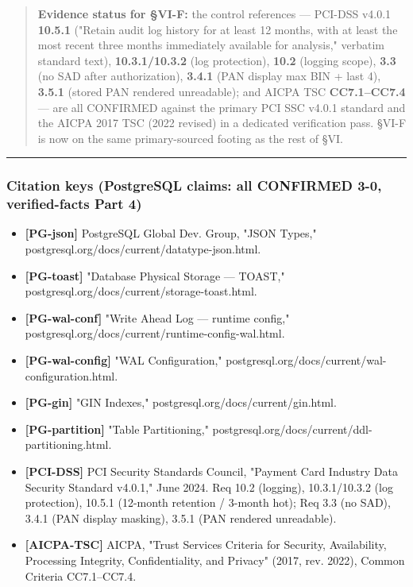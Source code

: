 \begin{quote}
\textbf{Evidence status for §VI-F:} the control references --- PCI-DSS
v4.0.1 \textbf{10.5.1} ("Retain audit log history for at least 12
months, with at least the most recent three months immediately available
for analysis," verbatim standard text), \textbf{10.3.1/10.3.2} (log
protection), \textbf{10.2} (logging scope), \textbf{3.3} (no SAD after
authorization), \textbf{3.4.1} (PAN display max BIN + last 4),
\textbf{3.5.1} (stored PAN rendered unreadable); and AICPA TSC
\textbf{CC7.1--CC7.4} --- are all CONFIRMED against the primary PCI SSC
v4.0.1 standard and the AICPA 2017 TSC (2022 revised) in a dedicated
verification pass. §VI-F is now on the same primary-sourced footing as
the rest of §VI.
\end{quote}

\begin{center}\rule{0.5\linewidth}{0.5pt}\end{center}

\subsubsection{Citation keys (PostgreSQL claims: all CONFIRMED 3-0,
verified-facts Part
4)}\label{citation-keys-postgresql-claims-all-confirmed-3-0-verified-facts-part-4}

\begin{itemize}
\tightlist
\item
  \textbf{{[}PG-json{]}} PostgreSQL Global Dev. Group, "JSON Types,"
  postgresql.org/docs/current/datatype-json.html.
\item
  \textbf{{[}PG-toast{]}} "Database Physical Storage --- TOAST,"
  postgresql.org/docs/current/storage-toast.html.
\item
  \textbf{{[}PG-wal-conf{]}} "Write Ahead Log --- runtime config,"
  postgresql.org/docs/current/runtime-config-wal.html.
\item
  \textbf{{[}PG-wal-config{]}} "WAL Configuration,"
  postgresql.org/docs/current/wal-configuration.html.
\item
  \textbf{{[}PG-gin{]}} "GIN Indexes,"
  postgresql.org/docs/current/gin.html.
\item
  \textbf{{[}PG-partition{]}} "Table Partitioning,"
  postgresql.org/docs/current/ddl-partitioning.html.
\item
  \textbf{{[}PCI-DSS{]}} PCI Security Standards Council, "Payment Card
  Industry Data Security Standard v4.0.1," June 2024. Req 10.2
  (logging), 10.3.1/10.3.2 (log protection), 10.5.1 (12-month retention
  / 3-month hot); Req 3.3 (no SAD), 3.4.1 (PAN display masking), 3.5.1
  (PAN rendered unreadable).
\item
  \textbf{{[}AICPA-TSC{]}} AICPA, "Trust Services Criteria for Security,
  Availability, Processing Integrity, Confidentiality, and Privacy"
  (2017, rev. 2022), Common Criteria CC7.1--CC7.4.
\end{itemize}

